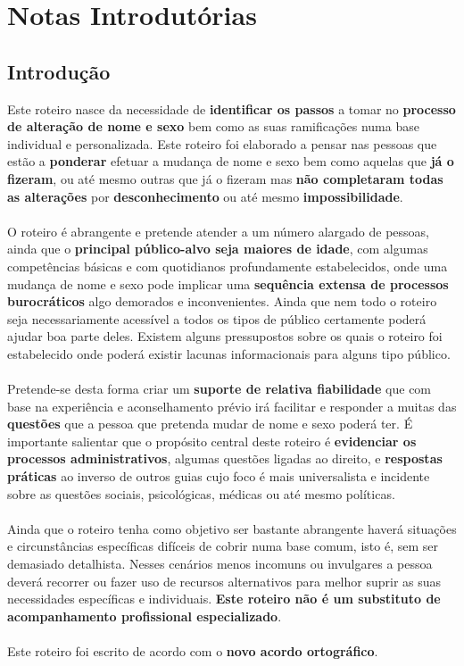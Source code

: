 
\newpage

\section{Notas Introdutórias}

\subsection{Introdução}

Este roteiro nasce da necessidade de \textbf{identificar os passos} a
tomar no \textbf{processo de alteração de nome e sexo} bem como as suas
ramificações numa base individual e personalizada. Este roteiro foi
elaborado a pensar nas pessoas que estão a \textbf{ponderar} efetuar a
mudança de nome e sexo bem como aquelas que \textbf{já o fizeram}, ou
até mesmo outras que já o fizeram mas \textbf{não completaram todas as 
	alterações} por \textbf{desconhecimento} ou até mesmo
\textbf{impossibilidade}. \\
\\
O roteiro é abrangente e pretende atender a um número alargado de
pessoas, ainda que o \textbf{principal público-alvo seja maiores de
	idade}, com algumas competências básicas e com quotidianos profundamente
estabelecidos, onde uma mudança de nome e sexo pode implicar uma
\textbf{sequência extensa de processos burocráticos} algo demorados e
inconvenientes. Ainda que nem todo o roteiro seja necessariamente
acessível a todos os tipos de público certamente poderá ajudar boa parte
deles. Existem alguns pressupostos sobre os quais o roteiro foi
estabelecido onde poderá existir lacunas informacionais para alguns tipo
público. \\
\\
Pretende-se desta forma criar um \textbf{suporte de relativa
	fiabilidade} que com base na experiência e aconselhamento prévio irá
facilitar e responder a muitas das \textbf{questões} que a pessoa que
pretenda mudar de nome e sexo poderá ter. É importante salientar que o
propósito central deste roteiro é \textbf{evidenciar os processos
	administrativos}, algumas questões ligadas ao direito, e
\textbf{respostas práticas} ao inverso de outros guias cujo foco é mais
universalista e incidente sobre as questões sociais, psicológicas,
médicas ou até mesmo políticas. \\
\\
Ainda que o roteiro tenha como objetivo ser bastante abrangente haverá
situações e circunstâncias específicas difíceis de cobrir numa base
comum, isto é, sem ser demasiado detalhista. Nesses cenários menos
incomuns ou invulgares a pessoa deverá recorrer ou fazer uso de recursos
alternativos para melhor suprir as suas necessidades específicas e
individuais. \textbf{Este roteiro não é um substituto de acompanhamento
	profissional especializado}. \\
\\
Este roteiro foi escrito de acordo com o \textbf{novo acordo
	ortográfico}.
	
